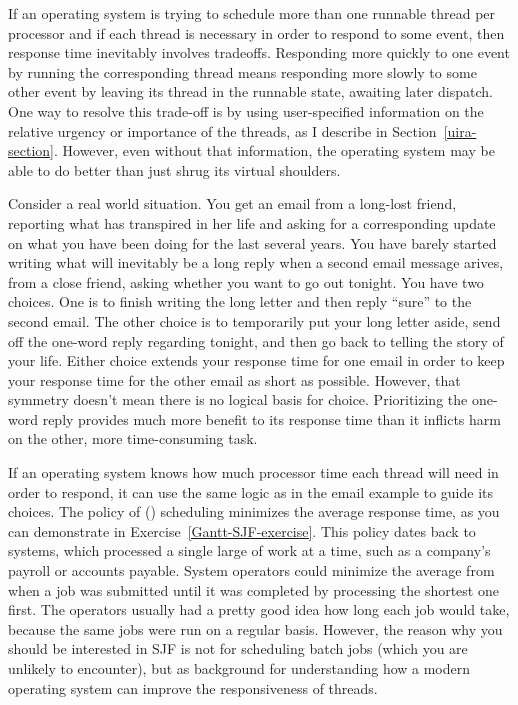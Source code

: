 If an operating system is trying to schedule more than one runnable thread
per processor and if each thread is necessary in order to
respond to some event, then response time inevitably involves
tradeoffs.  Responding more quickly to one event by running the
corresponding thread means responding more slowly to some other event
by leaving its thread in the runnable state, awaiting later
dispatch.  One way to resolve this trade-off is by using
user-specified information on the relative urgency or importance of
the threads, as I describe in Section~\ref{uira-section}.  However, even without that
information, the operating system may be able to do better than just
shrug its virtual shoulders.

Consider a real world situation.  You get an email from a long-lost
friend, reporting what has transpired in her life and asking for a
corresponding update on what you have been doing for the last several
years.  You have barely started writing what will inevitably be a long
reply when a second email message arives, from a close friend, asking
whether you want to go out tonight.  You have two choices.  One is to
finish writing the long letter and then reply ``sure'' to the second
email.  The other choice is to temporarily put your long letter aside,
send off the one-word reply regarding tonight, and then go back to
telling the story of your life.  Either choice extends your response
time for one email in order to keep your response time for the other
email as short as possible.  However, that symmetry doesn't mean there is no logical
basis for choice.  Prioritizing the one-word reply provides much more
benefit to its response time than it inflicts harm on the other, more
time-consuming task.

If an operating system knows how much processor time each thread will
need in order to respond, it can use the same logic as in the email
example to guide its choices.  The policy of  () scheduling minimizes the average response time,
as you can demonstrate in Exercise~\ref{Gantt-SJF-exercise}.
This policy dates back to  systems, which processed a
single large  of work at a time, such as a company's
payroll or accounts payable.  System operators could minimize the
average  from when a job was submitted until it
was completed by processing the shortest one first.  The operators
usually had a pretty good idea how long each job would take, because
the same jobs were run on a regular basis.  However, the reason why
you should be interested in SJF is not for scheduling batch jobs
(which you are unlikely to encounter), but as background for
understanding how a modern operating system can improve the
responsiveness of threads.

